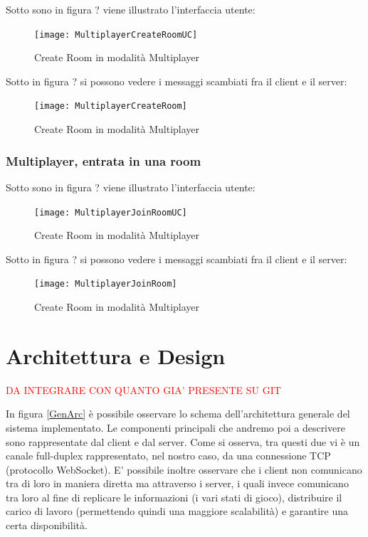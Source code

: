 \documentclass[paper=a4, fontsize=11pt]{scrartcl} %
\numberwithin{equation}{section} %
\numberwithin{figure}{section} %
\numberwithin{table}{section} %
\begin{document}
Sotto sono in figura ? viene illustrato l'interfaccia utente:

\begin{figure}[h]
\centering
\texttt{[image: MultiplayerCreateRoomUC]}
\caption{Create Room in modalità Multiplayer}
\label{CreateRoomUC}
\end{figure}

Sotto in figura ? si possono vedere i messaggi scambiati fra il client e il server:

\begin{figure}[h]
\centering
\texttt{[image: MultiplayerCreateRoom]}
\caption{Create Room in modalità Multiplayer}
\label{CreateRoom}
\end{figure}


\subsubsection{Multiplayer, entrata in una room}
Sotto sono in figura ? viene illustrato l'interfaccia utente:

\begin{figure}[h]
\centering
\texttt{[image: MultiplayerJoinRoomUC]}
\caption{Create Room in modalità Multiplayer}
\label{CreateRoomUC}
\end{figure}

Sotto in figura ? si possono vedere i messaggi scambiati fra il client e il server:

\begin{figure}[h]
\centering
\texttt{[image: MultiplayerJoinRoom]}
\caption{Create Room in modalità Multiplayer}
\label{CreateRoom}
\end{figure}

\section{Architettura e Design}
\textcolor{red}{DA INTEGRARE CON QUANTO GIA' PRESENTE SU GIT}

In figura \ref{GenArc} è possibile osservare lo schema dell'architettura generale del sistema implementato. Le componenti principali che andremo poi a descrivere sono rappresentate dal client e dal server. Come si osserva, tra questi due vi è un canale full-duplex rappresentato, nel nostro caso, da una connessione TCP (protocollo WebSocket). E' possibile inoltre osservare che i client non comunicano tra di loro in maniera diretta ma attraverso i server, i quali invece comunicano tra loro al fine di replicare le informazioni (i vari stati di gioco), distribuire il carico di lavoro (permettendo quindi una maggiore scalabilità) e garantire una certa disponibilità.
\end{document}
